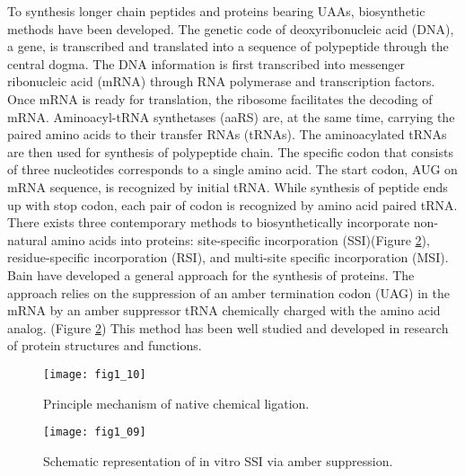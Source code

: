 \begin{refsection}
To synthesis longer chain
peptides and proteins bearing UAAs, biosynthetic methods have been developed.
The genetic code of deoxyribonucleic acid (DNA), a gene, is transcribed and
translated into a sequence of polypeptide through the central
dogma\cite{CRICK1970}. The DNA information is first transcribed into messenger
ribonucleic acid (mRNA) through RNA polymerase and transcription factors. Once
mRNA is ready for translation, the ribosome facilitates the decoding of mRNA.
Aminoacyl-tRNA synthetases (aaRS) are, at the same time, carrying the paired
amino acids to their transfer RNAs (tRNAs). The aminoacylated tRNAs are then
used for synthesis of polypeptide chain. The specific codon that consists of
three nucleotides corresponds to a single amino acid. The start codon, AUG on
mRNA sequence, is recognized by initial tRNA. While synthesis of peptide ends
up with stop codon, each pair of codon is recognized by amino acid paired
tRNA\cite{Sadava2006}. There exists three contemporary methods to
biosynthetically incorporate non-natural amino acids into proteins:
site-specific incorporation (SSI)(Figure \ref{fig:ssi-intro}), residue-specific
incorporation (RSI), and multi-site specific incorporation (MSI). Bain
 have developed a general approach for the 
synthesis of proteins\cite{Bain1991}.  The approach relies on the suppression
of an amber termination codon (UAG) in the mRNA by an amber suppressor tRNA
chemically charged with the amino acid analog.  (Figure \ref{fig:ssi-intro})
This method has been well studied and developed in research of protein
structures and functions\cite{Martoglio1995,Eichler1997}.
\begin{figure}[h!] \centering \texttt{[image: fig1\_10]}
    \caption[Princilple mechanism of native chemical ligation.]
    {Principle mechanism of native chemical ligation.} 
    \label{fig:ncl-intro} 
\end{figure}
\clearpage
\begin{figure}[h!] \centering \texttt{[image: fig1\_09]}
    \caption[Schematic representation of in vitro SSI via amber
    suppression.]{Schematic representation of in vitro SSI via amber
    suppression.} 
    \label{fig:ssi-intro} 
\end{figure}


\end{refsection}
